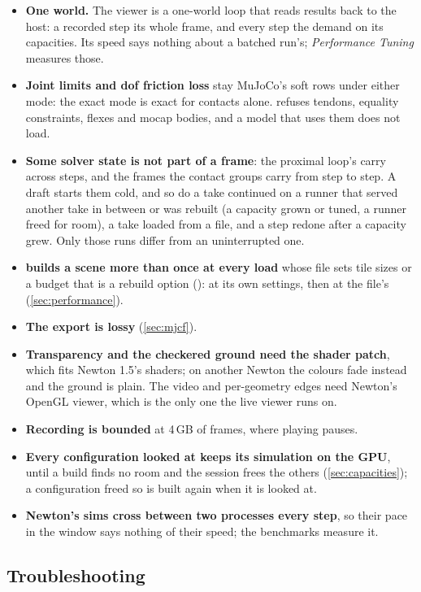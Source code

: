 \begin{itemize}
\item \textbf{One world.} The viewer is a one-world loop that reads results back to the host: a recorded step its whole frame, and every step the demand on its capacities. Its speed says nothing about a batched run's; \emph{Performance Tuning} measures those.
\item \textbf{Joint limits and dof friction loss} stay MuJoCo's soft rows under either mode: the exact mode is exact for contacts alone.  refuses tendons, equality constraints, flexes and mocap bodies, and a model that uses them does not load.
\item \textbf{Some solver state is not part of a frame}: the proximal loop's carry across steps, and the frames the contact groups carry from step to step. A draft starts them cold, and so do a take continued on a runner that served another take in between or was rebuilt (a capacity grown or tuned, a runner freed for room), a take loaded from a file, and a step redone after a capacity grew. Only those runs differ from an uninterrupted one.
\item \textbf{ builds a scene more than once at every load} whose file sets tile sizes or a budget that is a rebuild option (): at its own settings, then at the file's (\cref{sec:performance}).
\item \textbf{The export is lossy} (\cref{sec:mjcf}).
\item \textbf{Transparency and the checkered ground need the shader patch}, which fits Newton 1.5's shaders; on another Newton the colours fade instead and the ground is plain. The video and per-geometry edges need Newton's OpenGL viewer, which is the only one the live viewer runs on.
\item \textbf{Recording is bounded} at 4\,GB of frames, where playing pauses.
\item \textbf{Every configuration looked at keeps its simulation on the GPU}, until a build finds no room and the session frees the others (\cref{sec:capacities}); a configuration freed so is built again when it is looked at.
\item \textbf{Newton's sims cross between two processes every step}, so their pace in the window says nothing of their speed; the benchmarks measure it.
\end{itemize}

\subsection{Troubleshooting}\label{sec:trouble}

